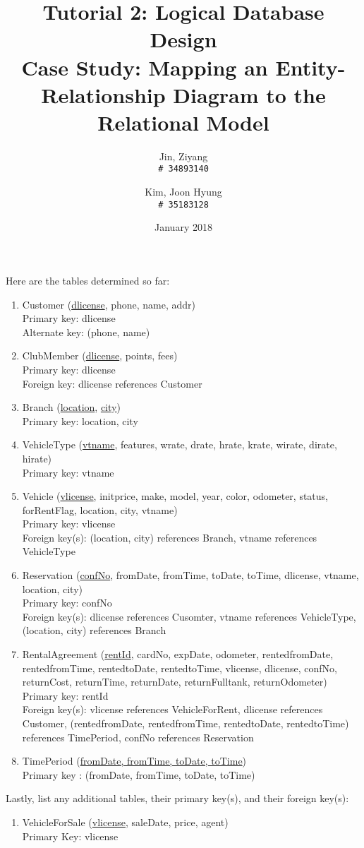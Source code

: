 \documentclass{article}
\title{%
	Tutorial 2: Logical Database Design \\
	\large Case Study: Mapping an Entity-Relationship Diagram to the Relational Model}
\author{
	Jin, Ziyang\\
	\texttt{\# 34893140}
	\and
	Kim, Joon Hyung\\
	\texttt{\# 35183128}
}
\date{January 2018}
\begin{document}
	\maketitle
	Here are the tables determined so far:
	\begin{enumerate}
		\item Customer (\underline{dlicense}, phone, name, addr) \\ 
			Primary key: dlicense \\ 
			Alternate key: (phone, name)

		\item ClubMember (\underline{dlicense}, points, fees)\\
			Primary key: dlicense \\
			Foreign key: dlicense references Customer

		\item Branch (\underline{location}, \underline{city}) \\
			Primary key: location, city

		\item VehicleType (\underline{vtname}, features, wrate, drate, hrate, krate, wirate, dirate, hirate) \\
			Primary key: vtname

		\item Vehicle (\underline{vlicense}, initprice, make, model, year, color, odometer, status, forRentFlag, location, city, vtname) \\
			Primary key: vlicense \\
			Foreign key(s): (location, city) references Branch, vtname references VehicleType

		\item Reservation (\underline{confNo}, fromDate, fromTime, toDate, toTime, dlicense, vtname, location, city)\\
			Primary key: confNo \\
			Foreign key(s): dlicense references Cusomter, vtname references VehicleType, (location, city) references Branch

		\item RentalAgreement (\underline{rentId}, cardNo, expDate, odometer, rentedfromDate, rentedfromTime,
			rentedtoDate, rentedtoTime, vlicense, dlicense, confNo, returnCost, returnTime, returnDate, returnFulltank, returnOdometer) \\
			Primary key: rentId \\
			Foreign key(s): vlicense references VehicleForRent, dlicense references Customer, (rentedfromDate, rentedfromTime, rentedtoDate, rentedtoTime) references TimePeriod, confNo references Reservation

		\item TimePeriod (\underline{fromDate, fromTime, toDate, toTime}) \\
			Primary key : (fromDate, fromTime, toDate, toTime)

	\end{enumerate}
	Lastly, list any additional tables, their primary key(s), and their foreign key(s):
	\begin{enumerate}
		\item VehicleForSale (\underline{vlicense}, saleDate, price, agent) \\
			Primary Key: vlicense
	\end{enumerate}
	
\end{document}
